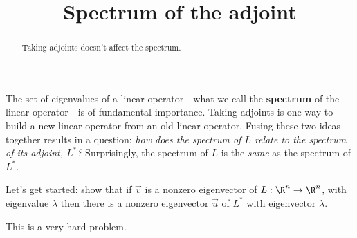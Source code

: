 \documentclass{ximera}
\title{Spectrum of the adjoint}
\begin{document}
\begin{abstract}
  Taking adjoints doesn't affect the spectrum.
\end{abstract}

The set of eigenvalues of a linear operator---what we call the
\textbf{spectrum} of the linear operator---is of fundamental
importance.  Taking adjoints is one way to build a new linear operator
from an old linear operator.  Fusing these two ideas together results
in a question: \textit{how does the spectrum of $L$ relate to the
  spectrum of its adjoint, $L^*$?}  Surprisingly, the spectrum of $L$
is the \textit{same} as the spectrum of $L^*$.
	
Let's get started: show that if $\vec{v}$ is a nonzero eigenvector of
$L:\R^n \to \R^n$, with eigenvalue $\lambda$ then there is a nonzero
eigenvector $\vec{u}$ of $L^*$ with eigenvector $\lambda$.

\begin{warning}
  This is a very hard problem.
\end{warning}
\end{document}
